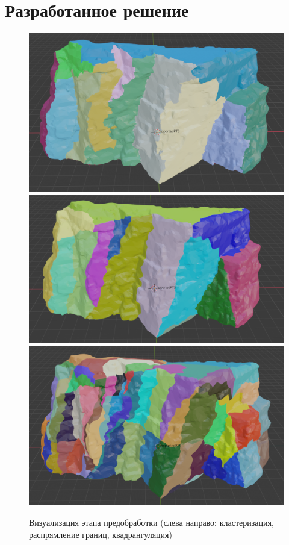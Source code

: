 \documentclass[12pt]{extarticle}
\begin{document}
\section{Разработанное решение}
\begin{figure}
  \includegraphics[scale=0.145]{clustering.png}
  \includegraphics[scale=0.145]{straightening.png}
  \includegraphics[scale=0.145]{quadrangulation.png}
  \caption{Визуализация этапа предобработки (слева направо: кластеризация, распрямление границ, квадрангуляция)}
\end{figure}
\end{document}
